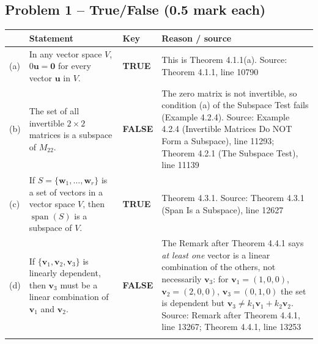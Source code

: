 \documentclass[11pt,a4paper]{article}
\newcommand{\Src}[1]{{\footnotesize\color{black!65}Source: #1}}
\begin{document}
\subsection*{Problem 1 -- True/False (0.5 mark each)}
\begin{tabularx}{\linewidth}{@{}l >{\raggedright\arraybackslash}X l >{\raggedright\arraybackslash}X@{}}\toprule & Statement & Key & Reason / source\\\midrule
(a) & In any vector space $V$, $0\mathbf{u}=\mathbf{0}$ for every vector $\mathbf{u}$ in $V$. & \textbf{TRUE} & This is Theorem 4.1.1(a). \Src{Theorem 4.1.1, line 10790}\\\addlinespace
(b) & The set of all invertible $2\times 2$ matrices is a subspace of $M_{22}$. & \textbf{FALSE} & The zero matrix is not invertible, so condition (a) of the Subspace Test fails (Example 4.2.4). \Src{Example 4.2.4 (Invertible Matrices Do NOT Form a Subspace), line 11293; Theorem 4.2.1 (The Subspace Test), line 11139}\\\addlinespace
(c) & If $S=\{\mathbf{w}_1,\dots,\mathbf{w}_r\}$ is a set of vectors in a vector space $V$, then $\operatorname{span}(S)$ is a subspace of $V$. & \textbf{TRUE} & Theorem 4.3.1. \Src{Theorem 4.3.1 (Span Is a Subspace), line 12627}\\\addlinespace
(d) & If $\{\mathbf{v}_1,\mathbf{v}_2,\mathbf{v}_3\}$ is linearly dependent, then $\mathbf{v}_3$ must be a linear combination of $\mathbf{v}_1$ and $\mathbf{v}_2$. & \textbf{FALSE} & The Remark after Theorem 4.4.1 says \emph{at least one} vector is a linear combination of the others, not necessarily $\mathbf{v}_3$: for $\mathbf{v}_1=(1,0,0)$, $\mathbf{v}_2=(2,0,0)$, $\mathbf{v}_3=(0,1,0)$ the set is dependent but $\mathbf{v}_3\neq k_1\mathbf{v}_1+k_2\mathbf{v}_2$. \Src{Remark after Theorem 4.4.1, line 13267; Theorem 4.4.1, line 13253}\\\addlinespace
\bottomrule\end{tabularx}
\end{document}
